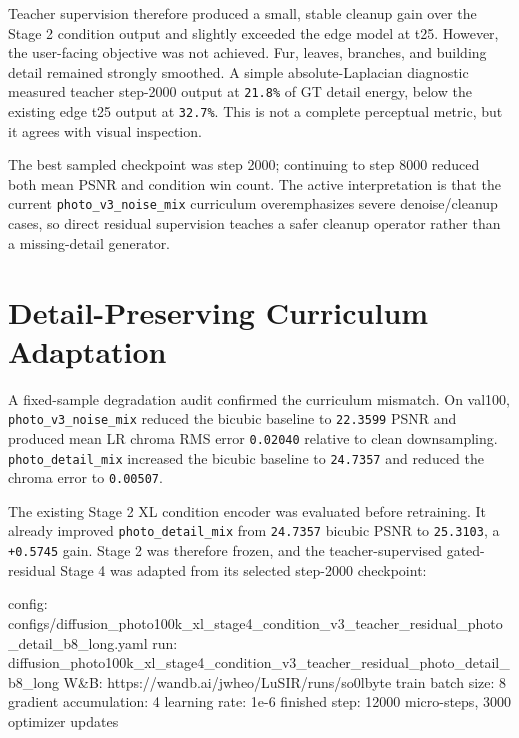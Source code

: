 \documentclass[
  10pt,
]{article}
\newenvironment{Shaded}{}{}
\newcommand{\NormalTok}[1]{#1}
\begin{document}
Teacher supervision therefore produced a small, stable cleanup gain over
the Stage 2 condition output and slightly exceeded the edge model at
t25. However, the user-facing objective was not achieved. Fur, leaves,
branches, and building detail remained strongly smoothed. A simple
absolute-Laplacian diagnostic measured teacher step-2000 output at
\texttt{21.8\%} of GT detail energy, below the existing edge t25 output
at \texttt{32.7\%}. This is not a complete perceptual metric, but it
agrees with visual inspection.

The best sampled checkpoint was step 2000; continuing to step 8000
reduced both mean PSNR and condition win count. The active
interpretation is that the current \texttt{photo\_v3\_noise\_mix}
curriculum overemphasizes severe denoise/cleanup cases, so direct
residual supervision teaches a safer cleanup operator rather than a
missing-detail generator.

\hypertarget{detail-preserving-curriculum-adaptation}{%
\section{Detail-Preserving Curriculum
Adaptation}\label{detail-preserving-curriculum-adaptation}}

A fixed-sample degradation audit confirmed the curriculum mismatch. On
val100, \texttt{photo\_v3\_noise\_mix} reduced the bicubic baseline to
\texttt{22.3599} PSNR and produced mean LR chroma RMS error
\texttt{0.02040} relative to clean downsampling.
\texttt{photo\_detail\_mix} increased the bicubic baseline to
\texttt{24.7357} and reduced the chroma error to \texttt{0.00507}.

The existing Stage 2 XL condition encoder was evaluated before
retraining. It already improved \texttt{photo\_detail\_mix} from
\texttt{24.7357} bicubic PSNR to \texttt{25.3103}, a \texttt{+0.5745}
gain. Stage 2 was therefore frozen, and the teacher-supervised
gated-residual Stage 4 was adapted from its selected step-2000
checkpoint:

\begin{Shaded}
\begin{Highlighting}[]
\NormalTok{config: configs/diffusion\_photo100k\_xl\_stage4\_condition\_v3\_teacher\_residual\_photo\_detail\_b8\_long.yaml}
\NormalTok{run: diffusion\_photo100k\_xl\_stage4\_condition\_v3\_teacher\_residual\_photo\_detail\_b8\_long}
\NormalTok{W\&B: https://wandb.ai/jwheo/LuSIR/runs/so0lbyte}
\NormalTok{train batch size: 8}
\NormalTok{gradient accumulation: 4}
\NormalTok{learning rate: 1e{-}6}
\NormalTok{finished step: 12000 micro{-}steps, 3000 optimizer updates}
\end{Highlighting}
\end{Shaded}
\end{document}
